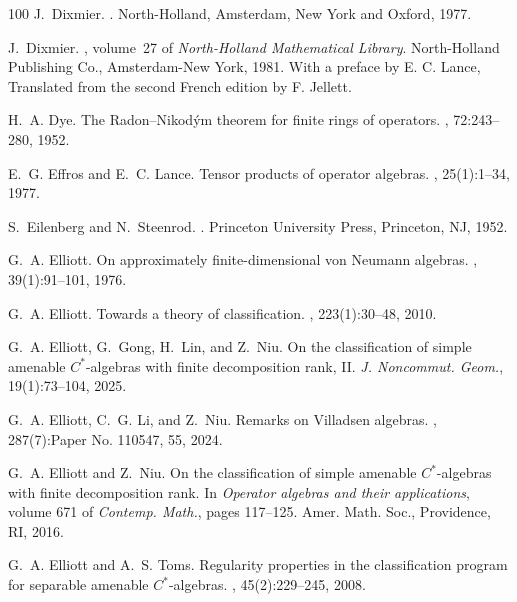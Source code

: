 \documentclass[a4paper,11pt]{amsart}
\theoremstyle{definition}
\numberwithin{equation}{section}
\numberwithin{theorem}{section}
\begin{document}
\begin{thebibliography}{100}
J.~Dixmier.
.
\newblock North-Holland, Amsterdam, New York and Oxford, 1977.

J.~Dixmier.
, volume~27 of {\em North-Holland
  Mathematical Library}.
\newblock North-Holland Publishing Co., Amsterdam-New York, 1981.
\newblock With a preface by E. C. Lance, Translated from the second French
  edition by F. Jellett.

H.~A. Dye.
\newblock The {R}adon--{N}ikod\'{y}m theorem for finite rings of operators.
, 72:243--280, 1952.

E.~G. Effros and E.~C. Lance.
\newblock Tensor products of operator algebras.
, 25(1):1--34, 1977.

S.~Eilenberg and N.~Steenrod.
.
\newblock Princeton University Press, Princeton, NJ, 1952.

G.~A. Elliott.
\newblock On approximately finite-dimensional von {N}eumann algebras.
, 39(1):91--101, 1976.

G.~A. Elliott.
\newblock Towards a theory of classification.
, 223(1):30--48, 2010.

G.~A. Elliott, G.~Gong, H.~Lin, and Z.~Niu.
\newblock On the classification of simple amenable {$C^*$}-algebras with finite
  decomposition rank, {II}.
\newblock \emph{J. Noncommut. Geom.}, 19(1):73--104, 2025.

G.~A. Elliott, C.~G. Li, and Z.~Niu.
\newblock Remarks on {V}illadsen algebras.
, 287(7):Paper No. 110547, 55, 2024.

G.~A. Elliott and Z.~Niu.
\newblock On the classification of simple amenable {$C^*$}-algebras with finite
  decomposition rank.
\newblock In {\em Operator algebras and their applications}, volume 671 of {\em
  Contemp. Math.}, pages 117--125. Amer. Math. Soc., Providence, RI, 2016.

G.~A. Elliott and A.~S. Toms.
\newblock Regularity properties in the classification program for separable
  amenable {$C^*$}-algebras.
, 45(2):229--245, 2008.


\end{thebibliography}
\end{document}
